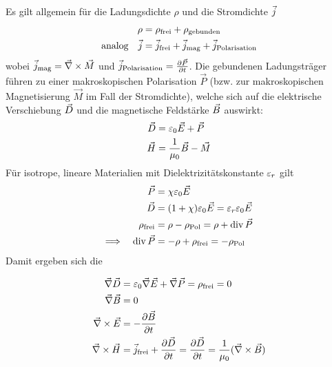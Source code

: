 Es gilt allgemein für die Ladungsdichte $\rho$%
und die
Stromdichte $\vecj$%
\begin{align*}
  \rho&=\rho_\text{frei}+\rho_\text{gebunden}\\
  \text{analog}\quad
  \vecj&=\vecj_\text{frei} + \vecj_\text{mag} + \vecj_\text{Polarisation}
\end{align*}
wobei   
$\vecj_\text{mag} = \vecna\times\vec{M}$ und 
$\vecj_\text{Polarisation}=\dif[\vec{P}]{t}$.
Die gebundenen Ladungsträger führen zu einer makroskopischen
Polarisation $\vec{P}$%
(bzw. zur makroskopischen Magnetisierung $\vec{M}$%
im Fall der Stromdichte), welche sich auf die elektrische
Verschiebung $\vecD$ und die magnetische Feldstärke $\vecB$ auswirkt:
\begin{align*}
  \vecD&=\epso\vecE+\vecP\\
  \vecH&=\frac{1}{\muo}\vecB-\vecM
\end{align*}%
Für isotrope, lineare Materialien mit Dielektrizitätskonstante
$\eps_r$ gilt
\begin{align*}
  \vecP&= \chi \epso\vecE\\
  \vecD&= (1+\chi)\epso\vecE=\eps_r\epso\vecE\\
  \rho_\text{frei}
       &= \rho-\rho_\text{Pol}
         = \rho+\Div\vecP\\
  \Longrightarrow \quad
  \Div\vecP&= -\rho + \rho_\text{frei} = -\rho_\text{Pol}
\end{align*}%
%
Damit ergeben sich die

\begin{align*}
  \vecna\vecD&=\epso\vecna\vecE+\vecna\vecP=\rho_\text{frei}=0\\
  \vecna\vecB&=0\\
  \vecna\times\vecE&=-\dif[\vecB]{t}\\
  \vecna\times\vecH&=\vecj_\text{frei}+\dif[\vecD]{t}
                     =\dif[\vecD]{t}=\frac{1}{\muo}(\vecna\times\vecB)
\end{align*}

